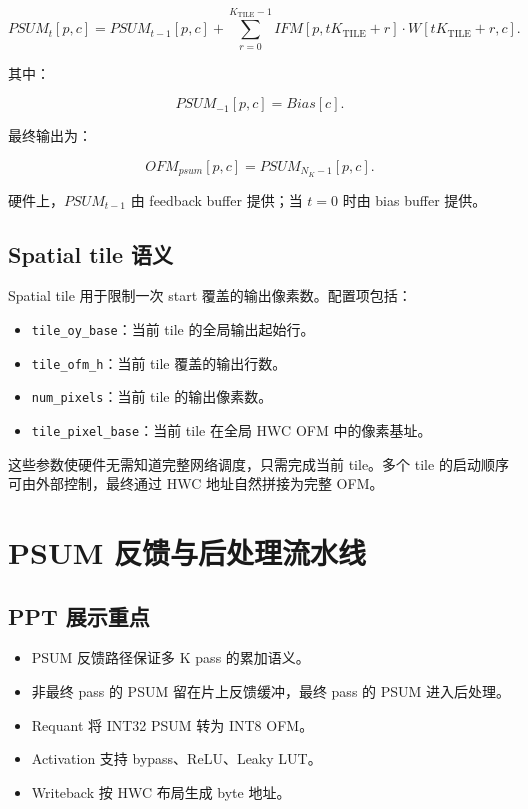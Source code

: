 \documentclass[fontset=fandol,ugly,language=chinese]{pkuthss}
\newcommand{\signal}[1]{\texttt{#1}}
\newcommand{\KTILE}{K_{\mathrm{TILE}}}
\begin{document}
\begin{equation}
PSUM_t[p,c] =
PSUM_{t-1}[p,c] +
\sum_{r=0}^{\KTILE-1}
IFM[p,t\KTILE+r]\cdot W[t\KTILE+r,c].
\end{equation}

其中：

\begin{equation}
PSUM_{-1}[p,c] = Bias[c].
\end{equation}

最终输出为：

\begin{equation}
OFM_{psum}[p,c] = PSUM_{N_K-1}[p,c].
\end{equation}

硬件上，$PSUM_{t-1}$ 由 feedback buffer 提供；当 $t=0$ 时由 bias buffer 提供。

\section{Spatial tile 语义}

Spatial tile 用于限制一次 start 覆盖的输出像素数。配置项包括：

\begin{itemize}
    \item \signal{tile\_oy\_base}：当前 tile 的全局输出起始行。
    \item \signal{tile\_ofm\_h}：当前 tile 覆盖的输出行数。
    \item \signal{num\_pixels}：当前 tile 的输出像素数。
    \item \signal{tile\_pixel\_base}：当前 tile 在全局 HWC OFM 中的像素基址。
\end{itemize}

这些参数使硬件无需知道完整网络调度，只需完成当前 tile。多个 tile 的启动顺序可由外部控制，最终通过 HWC 地址自然拼接为完整 OFM。

\chapter{PSUM 反馈与后处理流水线}

\section{PPT 展示重点}

\begin{itemize}
    \item PSUM 反馈路径保证多 K pass 的累加语义。
    \item 非最终 pass 的 PSUM 留在片上反馈缓冲，最终 pass 的 PSUM 进入后处理。
    \item Requant 将 INT32 PSUM 转为 INT8 OFM。
    \item Activation 支持 bypass、ReLU、Leaky LUT。
    \item Writeback 按 HWC 布局生成 byte 地址。
\end{itemize}
\end{document}
